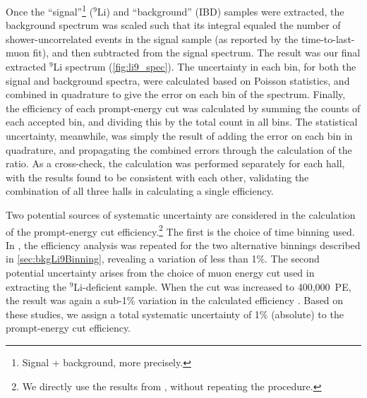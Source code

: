 \documentclass[../thesis.tex]{subfiles}
\begin{document}
Once the ``signal''\footnote{Signal + background, more precisely.} ($^9$Li) and ``background'' (IBD) samples were extracted, the background spectrum was scaled such that its integral equaled the number of shower-uncorrelated events in the signal sample (as reported by the time-to-last-muon fit), and then subtracted from the signal spectrum. The result was our final extracted $^9$Li spectrum (\autoref{fig:li9_spec}). The uncertainty in each bin, for both the signal and background spectra, were calculated based on Poisson statistics, and combined in quadrature to give the error on each bin of the spectrum. Finally, the efficiency of each prompt-energy cut was calculated by summing the counts of each accepted bin, and dividing this by the total count in all bins. The statistical uncertainty, meanwhile, was simply the result of adding the error on each bin in quadrature, and propagating the combined errors through the calculation of the ratio. As a cross-check, the calculation was performed separately for each hall, with the results found to be consistent with each other, validating the combination of all three halls in calculating a single efficiency.

Two potential sources of systematic uncertainty are considered in the calculation of the prompt-energy cut efficiency.\footnote{We directly use the results from \cite{ChrisLi9}, without repeating the procedure.} The first is the choice of time binning used. In \cite{ChrisLi9}, the efficiency analysis was repeated for the two alternative binnings described in \autoref{sec:bkgLi9Binning}, revealing a variation of less than 1\%. The second potential uncertainty arises from the choice of muon energy cut used in extracting the $^9$Li-deficient sample. When the cut was increased to 400,000~PE, the result was again a sub-1\% variation in the calculated efficiency \cite{ChrisLi9}. Based on these studies, we assign a total systematic uncertainty of 1\% (absolute) to the prompt-energy cut efficiency.
\end{document}
